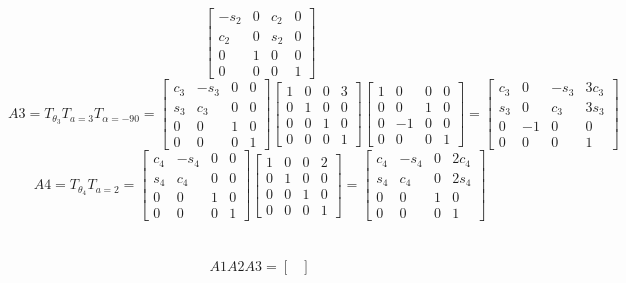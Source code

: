 \documentclass{article}
\begin{document}
{\[\begin{bmatrix}
-s_{2} & 0 & c_{2} & 0 \\
c_{2} & 0 & s_{2} & 0 \\
0 & 1 & 0 & 0 \\
0 & 0 & 0 & 1
\end{bmatrix}
\]
\[
A3=T_{\theta_{3}}T_{a=3}T_{\alpha=-90}
=
\begin{bmatrix}
c_{3} & - s_{3} & 0 & 0 \\
s_{3} & c_{3} & 0 & 0 \\
0 & 0 & 1 & 0 \\
0 & 0 & 0 & 1
\end{bmatrix}
\begin{bmatrix}
1 & 0 & 0 & 3 \\
0 & 1 & 0 & 0 \\
0 & 0 & 1 & 0 \\
0 & 0 & 0 & 1
\end{bmatrix}
\begin{bmatrix}
1 & 0 & 0 & 0 \\
0 & 0 & 1 & 0 \\
0 & -1 & 0 & 0 \\
0 & 0 & 0 & 1
\end{bmatrix}
=
\begin{bmatrix}
c_{3} & 0 & -s_{3} & 3c_{3} \\
s_{3} & 0 & c_{3} & 3s_{3} \\
0 & -1 & 0 & 0 \\
0 & 0 & 0 & 1
\end{bmatrix}
\]
\[
A4=T_{\theta_{4}}T_{a=2}
=
\begin{bmatrix}
c_{4} & - s_{4} & 0 & 0 \\
s_{4} & c_{4} & 0 & 0 \\
0 & 0 & 1 & 0 \\
0 & 0 & 0 & 1
\end{bmatrix}
\begin{bmatrix}
1 & 0 & 0 & 2 \\
0 & 1 & 0 & 0 \\
0 & 0 & 1 & 0 \\
0 & 0 & 0 & 1
\end{bmatrix}
=
\begin{bmatrix}
c_{4} & - s_{4} & 0 & 2c_{4} \\
s_{4} & c_{4} & 0 & 2s_{4} \\
0 & 0 & 1 & 0 \\
0 & 0 & 0 & 1
\end{bmatrix}
\]
\\
\\
\[
A1A2A3=
\begin{bmatrix}

\end{bmatrix}\]}
\end{document}
